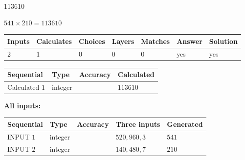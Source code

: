 \documentclass{ctexart}
\begin{document}
 

113610
 
 
\noindent{}
 
 

 
 
 
\noindent{}
 
 

$ %
541 \times  %
210=   %
113610$
 
 
\noindent{}
 
 

 
   
   
   
   
\noindent\begin{tabular}{|l|l|l|l|l|l|l|}
 \hline
Inputs & Calculates & Choices & Layers & Matches & Answer & Solution \\ \hline
 2  & 
 1  & 
 0
  & 
 0  & 
 0  & 
  yes & 
  yes 
  \\ \hline
 \end{tabular}
   
   
   
   
\noindent{}
   
   
  
  
\noindent\begin{tabular}{|l|l|l|l|}
\hline
 Sequential & Type & Accuracy & Calculated \\ 
\hline
 
 
  Calculated $  1 $ & integer &  & 
  $ 113610 $ 
 \\  \hline  
 \end{tabular}
   
   
   
   
\noindent\vspace{0.1in}\hspace{-0.08in} {\textbf{\Large{All inputs: }}}
   
   
  
  
\noindent\begin{tabular}{|l|l|l|l|l|}
\hline
 Sequential & Type & Accuracy & Three inputs & Generated \\ 
\hline
 
 
  INPUT $  1 $ & integer &  & $
 520
 , 
 960
 , 
 3
 $ & $ 541 $ 
 \\  \hline  
 
 
  INPUT $  2 $ & integer &  & $
 140
 , 
 480
 , 
 7
 $ & $ 210 $ 
 \\  \hline  
 \end{tabular}
   
\end{document}
